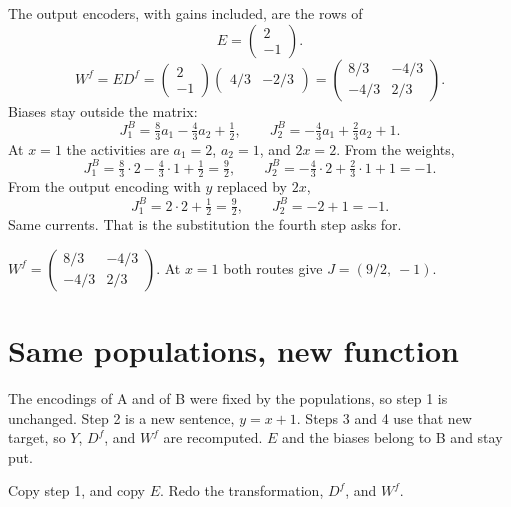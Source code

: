 \documentclass[11pt,letterpaper]{article}
\newcommand{\ans}[1]{\par\vspace{2pt}{\bfseries #1}\quad}
\begin{document}
\ans{4.}
The output encoders, with gains included, are the rows of
\[
E = \begin{pmatrix} 2 \\ -1 \end{pmatrix}.
\]
\[
W^f = E D^f
  = \begin{pmatrix} 2 \\ -1 \end{pmatrix}
    \begin{pmatrix} 4/3 & -2/3 \end{pmatrix}
  = \begin{pmatrix} 8/3 & -4/3 \\ -4/3 & 2/3 \end{pmatrix}.
\]
Biases stay outside the matrix:
\[
J_1^{B} = \tfrac83 a_1 - \tfrac43 a_2 + \tfrac12, \qquad
J_2^{B} = -\tfrac43 a_1 + \tfrac23 a_2 + 1.
\]
At $x = 1$ the activities are $a_1 = 2$, $a_2 = 1$, and $2x = 2$.
From the weights,
\[
J_1^{B} = \tfrac83\cdot 2 - \tfrac43\cdot 1 + \tfrac12 = \tfrac92, \qquad
J_2^{B} = -\tfrac43\cdot 2 + \tfrac23\cdot 1 + 1 = -1.
\]
From the output encoding with $y$ replaced by $2x$,
\[
J_1^{B} = 2\cdot 2 + \tfrac12 = \tfrac92, \qquad
J_2^{B} = -2 + 1 = -1.
\]
Same currents. That is the substitution the fourth step asks for.
\begin{result}
$W^f = \begin{pmatrix} 8/3 & -4/3 \\ -4/3 & 2/3 \end{pmatrix}$.
At $x = 1$ both routes give $J = (9/2,\ -1)$.
\end{result}

\section{Same populations, new function}

\ans{1.}
The encodings of A and of B were fixed by the populations, so step 1 is unchanged. Step 2 is a new sentence, $y = x + 1$. Steps 3 and 4 use that new target, so $Y$, $D^f$, and $W^f$ are recomputed. $E$ and the biases belong to B and stay put.
\begin{result}
Copy step 1, and copy $E$. Redo the transformation, $D^f$, and $W^f$.
\end{result}
\end{document}

